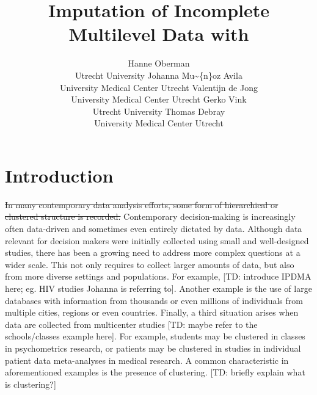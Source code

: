 \documentclass[
]{jss}
\author{
Hanne Oberman\\Utrecht University \And Johanna Mu\textasciitilde\{n\}oz
Avila\\University Medical Center Utrecht \AND Valentijn de
Jong\\University Medical Center Utrecht \And Gerko Vink\\Utrecht
University \AND Thomas Debray\\University Medical Center Utrecht
}
\title{Imputation of Incomplete Multilevel Data with \pkg{mice}}
\begin{document}
\hypertarget{introduction}{%
\section{Introduction}\label{introduction}}

\sout{In many contemporary data analysis efforts, some form of
hierarchical or clustered structure is recorded.} Contemporary
decision-making is increasingly often data-driven and sometimes even
entirely dictated by data. Although data relevant for decision makers
were initially collected using small and well-designed studies, there
has been a growing need to address more complex questions at a wider
scale. This not only requires to collect larger amounts of data, but
also from more diverse settings and populations. For example, {[}TD:
introduce IPDMA here; eg. HIV studies Johanna is referring to{]}.
Another example is the use of large databases with information from
thousands or even millions of individuals from multiple cities, regions
or even countries. Finally, a third situation arises when data are
collected from multicenter studies {[}TD: maybe refer to the
schools/classes example here{]}. For example, students may be clustered
in classes in psychometrics research, or patients may be clustered in
studies in individual patient data meta-analyses in medical research. A
common characteristic in aforementioned examples is the presence of
clustering. {[}TD: briefly explain what is clustering?{]}
\end{document}
